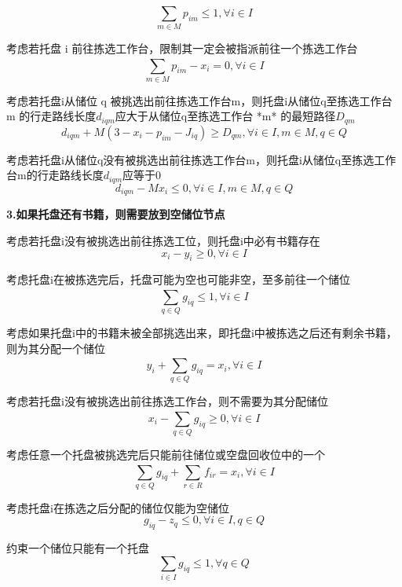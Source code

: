 \documentclass[withoutpreface,bwprint]{thesis-config}
\begin{document}
\begin{equation}
    \sum _ {m \in M}^ {} p_ {im}   \leqslant  1, \forall  i  \in I	
\end{equation}
\par 考虑若托盘 i 前往拣选工作台，限制其一定会被指派前往一个拣选工作台
\begin{equation}
    \sum _ {m\in M}^ {}  p_ {im}  -  x_ {i}  =0,  \forall  i  \in  I	
\end{equation}
\par 考虑若托盘i从储位 q 被挑选出前往拣选工作台m，则托盘i从储位q至拣选工作台 m 的行走路线长度$d_{iqm}$应大于从储位q至拣选工作台 *m* 的最短路径$D_{qm}$
\begin{equation}
    d_ {iqm}  +M(3-  x_ {i}  -  p_ {im}  -  J_ {iq}  )  \geqslant   D_ {qm}  ,  \forall  i  \in  I,m  \in  M,q  \in  Q	
\end{equation}
\par 考虑若托盘i从储位q没有被挑选出前往拣选工作台m，则托盘i从储位q至拣选工作台m的行走路线长度$d_{iqm}$应等于0
\begin{equation}
    d_ {iqm}  -M x_ {i}  \leqslant  0,  \forall  i  \in I,m  \in M,q \in  Q   
\end{equation}
\par \textbf{3.如果托盘还有书籍，则需要放到空储位节点}
\par 考虑若托盘i没有被挑选出前往拣选工位，则托盘i中必有书籍存在
\begin{equation}
    x_ {i}  -  y_ {i}  \geqslant 0,  \forall  i  \in I   
\end{equation}
\par 考虑托盘i在被拣选完后，托盘可能为空也可能非空，至多前往一个储位
\begin{equation}
    \sum _ {q\in Q}^ {}   g_ {iq}   \leqslant  1,  \forall  i  \in I   
\end{equation}
\par  考虑如果托盘i中的书籍未被全部挑选出来，即托盘i中被拣选之后还有剩余书籍，则为其分配一个储位
\begin{equation}
    y_ {i}  +  \sum _ {q \in Q}^ {}   g_ {iq}   = x_i, \forall  i \in I   
\end{equation}
\par 考虑若托盘i没有被挑选出前往拣选工作台，则不需要为其分配储位
\begin{equation}
    x_ {i}  -  \sum _ {q\in Q}^ {}  g_ {iq}   \geqslant  0,  \forall  i  \in I   
\end{equation}
\par 考虑任意一个托盘被挑选完后只能前往储位或空盘回收位中的一个
\begin{equation}
    \sum _ {q \in Q}^ {}   g_ {iq}  +  \sum _ {r\in R}   f_ {ir}  = x_i,  \forall i \in I   
\end{equation}
\par 考虑托盘i在拣选之后分配的储位仅能为空储位
\begin{equation}
    g_ {iq}  -  z_ {q}   \leqslant  0, \forall  i \in I,q  \in  Q
\end{equation}
\par 约束一个储位只能有一个托盘
\begin{equation}
    \sum_{i \in I}g_{iq} \leqslant 1,\forall q \in Q  
\end{equation}
\end{document}
